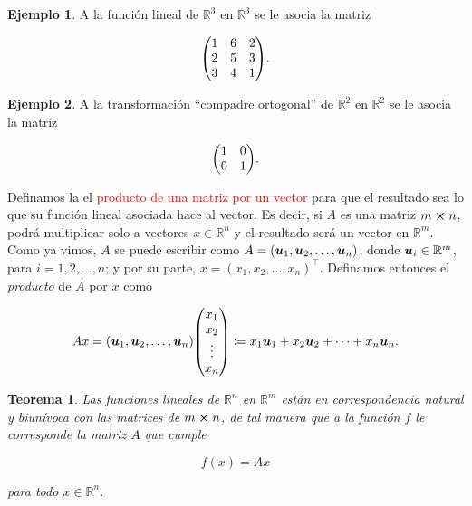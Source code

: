 \documentclass{article}
\theoremstyle{definicion}
\theoremstyle{definition}             %
\theoremstyle{definition}             %
\theoremstyle{definition}
\theoremstyle{definition}
\theoremstyle{observacion}
\theoremstyle{definition}
\theoremstyle{plain}
\newtheorem{theorem}{Teorema}
\theoremstyle{definition}
\newtheorem{exe}{Ejemplo}
\theoremstyle{afirmacion}
\theoremstyle{notation}
\theoremstyle{definition}
\begin{document}
    \begin{exe}
        A la función lineal de \(\mathbb{R}^{3}\) en \(\mathbb{R}^{3}\) se le asocia la matriz

        \begin{equation*}
            \mqty(1 & 6 & 2\\
                2 & 5 & 3\\
                3 & 4 & 1).
        \end{equation*}
    \end{exe}

    \begin{exe}
        A la transformación ``compadre ortogonal'' de \(\mathbb{R}^{2}\) en \(\mathbb{R}^{2}\) se le asocia la matriz
        
        \begin{equation*}
            \mqty(1 & 0\\
                0 & 1).
        \end{equation*}
    \end{exe}

    Definamos la el \textcolor{red}{producto de una matriz por un vector} para que el resultado sea lo que su función lineal asociada hace al vector. Es decir, si \(A\) es una matriz \(m \cross n\), podrá multiplicar solo a vectores \(x \in \mathbb{R}^{n}\) y el resultado será un vector en \(\mathbb{R}^{m}\). Como ya vimos, \(A\) se puede escribir como \(A = (\vb*{u}_{1}, \vb*{u}_{2}, \dots, \vb*{u}_{n})\), donde \(\vb*{u}_{i} \in \mathbb{R}^{m}\), para \(i = 1, 2, \dots, n\); y por su parte, \(x = (x_{1}, x_{2}, \dots, x_{n})^{\top}\). Definamos entonces el \emph{producto} de \(A\) por \(x\) como

    \begin{equation*}
        A x = (\vb*{u}_{1}, \vb*{u}_{2}, \dots, \vb*{u}_{n})\mqty(x_{1} \\ x_{2} \\ \vdots \\ x_{n}) \coloneq x_{1}\vb*{u}_{1} + x_{2}\vb*{u}_{2} + \cdots + x_{n}\vb*{u}_{n}.
    \end{equation*}

    \begin{theorem}
        Las funciones lineales de \(\mathbb{R}^{n}\) en \(\mathbb{R}^{m}\) están en correspondencia natural y biunívoca con las matrices de \(m \cross n\), de tal manera que a la función \(f\) le corresponde la matriz \(A\) que cumple

        \begin{equation*}
            f(x) = Ax
        \end{equation*}

        para todo \(x \in \mathbb{R}^{n}\).
    \end{theorem}
\end{document}
